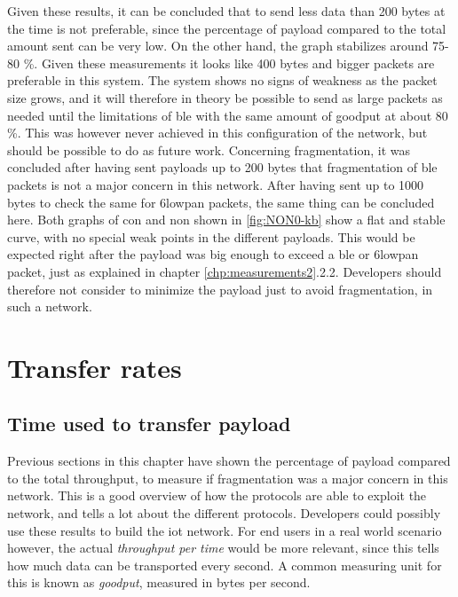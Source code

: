\noindent Given these results, it can be concluded that to send less data than 200 bytes at the time is not preferable, since the percentage of \gls{payload} compared to the total amount sent can be very low. On the other hand, the graph stabilizes around 75-80 \%. Given these measurements it looks like 400 bytes and bigger packets are preferable in this system. The system shows no signs of weakness as the packet size grows, and it will therefore in theory be possible to send as large packets as needed until the limitations of \gls{ble} with the same amount of goodput at about 80 \%. This was however never achieved in this configuration of the network, but should be possible to do as future work. Concerning fragmentation, it was concluded after having sent \glspl{payload} up to 200 bytes that fragmentation of \gls{ble} packets is not a major concern in this network. After having sent up to 1000 bytes to check the same for \gls{6lowpan} packets, the same thing can be concluded here. Both graphs of \gls{con} and \gls{non} shown in \ref{fig:NON0-kb} show a flat and stable curve, with no special weak points in the different \glspl{payload}. This would be expected right after the \gls{payload} was big enough to exceed a \gls{ble} or \gls{6lowpan} packet, just as explained in chapter \ref{chp:measurements2}.2.2. Developers should therefore not consider to minimize the \gls{payload} just to avoid fragmentation, in such a network. 




\section{Transfer rates}

\subsection{Time used to transfer payload}

\noindent Previous sections in this chapter have shown the percentage of payload compared to the total throughput, to measure if fragmentation was a major concern in this network. This is a good overview of how the protocols are able to exploit the network, and tells a lot about the different protocols. Developers could possibly use these results to build the \gls{iot} network. For end users in a real world scenario however, the actual \textit{throughput per time} would be more relevant, since this tells how much data can be transported every second. A common measuring unit for this is known as \textit{\gls{goodput}}, measured in bytes per second.  



